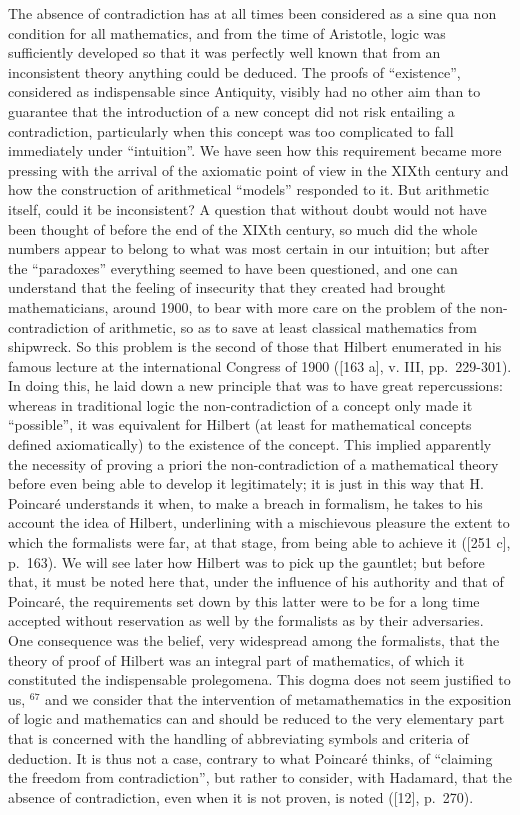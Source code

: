 The absence of contradiction has at all times been considered as a sine qua non condition for all mathematics, and from the time of Aristotle, logic was sufficiently developed so that it was perfectly well known that from an inconsistent theory anything could be deduced. The proofs of ``existence'', considered as indispensable since Antiquity, visibly had no other aim than to guarantee that the introduction of a new concept did not risk entailing a contradiction, particularly when this concept was too complicated to fall immediately under ``intuition''. We have seen how this requirement became more pressing with the arrival of the axiomatic point of view in the XIXth century and how the construction of arithmetical ``models'' responded to it. But arithmetic itself, could it be inconsistent? A question that without doubt would not have been thought of before the end of the XIXth century, so much did the whole numbers appear to belong to what was most certain in our intuition; but after the ``paradoxes'' everything seemed to have been questioned, and one can understand that the feeling of insecurity that they created had brought mathematicians, around 1900, to bear with more care on the problem of the non-contradiction of arithmetic, so as to save at least classical mathematics from shipwreck. So this problem is the second of those that Hilbert enumerated in his famous lecture at the international Congress of 1900 ({[}163 a{]}, v. III, pp.~229-301). In doing this, he laid down a new principle that was to have great repercussions: whereas in traditional logic the non-contradiction of a concept only made it ``possible'', it was equivalent for Hilbert (at least for mathematical concepts defined axiomatically) to the existence of the concept. This implied apparently the necessity of proving a priori the non-contradiction of a mathematical theory before even being able to develop it legitimately; it is just in this way that H. Poincaré understands it when, to make a breach in formalism, he takes to his account the idea of Hilbert, underlining with a mischievous pleasure the extent to which the formalists were far, at that stage, from being able to achieve it ({[}251 c{]}, p.~163). We will see later how Hilbert was to pick up the gauntlet; but before that, it must be noted here that, under the influence of his authority and that of Poincaré, the requirements set down by this latter were to be for a long time accepted without reservation as well by the formalists as by their adversaries. One consequence was the belief, very widespread among the formalists, that the theory of proof of Hilbert was an integral part of mathematics, of which it constituted the indispensable prolegomena. This dogma does not seem justified to us, \(^{67}\) and we consider that the intervention of metamathematics in the exposition of logic and mathematics can and should be reduced to the very elementary part that is concerned with the handling of abbreviating symbols and criteria of deduction. It is thus not a case, contrary to what Poincaré thinks, of ``claiming the freedom from contradiction'', but rather to consider, with Hadamard, that the absence of contradiction, even when it is not proven, is noted ({[}12{]}, p.~270).

